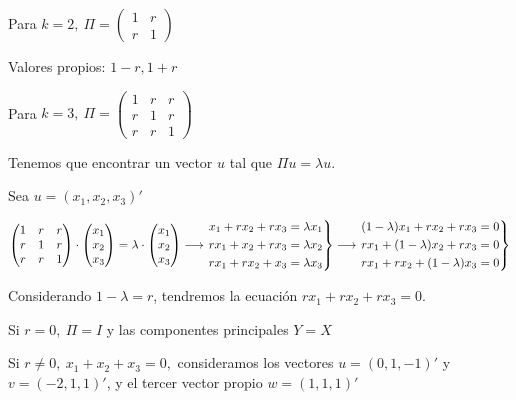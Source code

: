 \begin{enumerate}[label=\color{red}\textbf{\arabic*)}, leftmargin=*]
	Para $k=2,\:\Pi=\begin{pmatrix}
		1 & r\\
		r & 1
	\end{pmatrix}$
	
	Valores propios: $1-r, 1+r$
	
	Para $k=3,\:\Pi=\begin{pmatrix}
		1 & r & r \\
		r & 1 & r \\
		r & r & 1
	\end{pmatrix}$
	
	Tenemos que encontrar un vector $u$ tal que $\Pi u=\lambda u$.
	
	Sea $u=(x_1,x_2,x_3)'$
	
	$\begin{pmatrix}
		1 & r & r \\
		r & 1 & r \\
		r & r & 1
	\end{pmatrix}\cdot\begin{pmatrix}
	x_1\\
	x_2\\
	x_3
	\end{pmatrix}=\lambda\cdot\begin{pmatrix}
	x_1\\
	x_2\\
	x_3
	\end{pmatrix}\longrightarrow\begin{rcases}
	x_1+rx_2+rx_3=\lambda x_1\\
	rx_1+x_2+rx_3=\lambda x_2\\
	rx_1+rx_2+x_3=\lambda x_3\\
	\end{rcases}\longrightarrow\begin{rcases}
	(1-\lambda)x_1+rx_2+rx_3=0\\
	rx_1+(1-\lambda)x_2+rx_3=0\\
	rx_1+rx_2+(1-\lambda)x_3=0\\
	\end{rcases}$
	
	Considerando $1-\lambda=r$, tendremos la ecuación $rx_1+rx_2+rx_3=0$.
	
	Si $r=0,\:\Pi=I$ y las componentes principales $Y=X$
	
	Si $r\neq0,\:x_1+x_2+x_3=0,$ consideramos los vectores $u=(0,1,-1)'$ y $v=(-2,1,1)'$, y el tercer vector propio $w=(1,1,1)'$
	

\end{enumerate}
